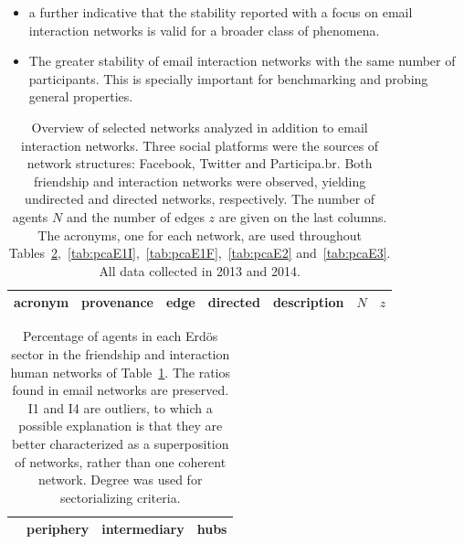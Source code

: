 \documentclass[%
 aip,
 jmp,%
 amsmath,amssymb,
 reprint,%
 floatfix,
]{revtex4-1}
\begin{document}
\begin{itemize}
	\item a further indicative that the stability reported with a focus on email interaction networks is valid for a broader class of phenomena.
	\item The greater stability of email interaction networks with the same number of participants. This is specially important for benchmarking and probing general properties.
\end{itemize}

\begin{table}[!h]
	\caption{Overview of selected networks analyzed in addition to email interaction networks. Three social platforms were the sources of network structures: Facebook, Twitter and Participa.br. Both friendship and interaction networks were observed, yielding undirected and directed networks, respectively. The number of agents $N$ and the number of edges $z$ are given on the last columns. The acronyms, one for each network, are used throughout Tables~\ref{tab:secE},~\ref{tab:pcaE1I},~\ref{tab:pcaE1F},~\ref{tab:pcaE2} and~\ref{tab:pcaE3}. All data collected in 2013 and 2014.}
\begin{center}
\begin{tabular}{| l | c | c | c | c | c | c | }\hline
	acronym & provenance & edge & directed & description & $N$ & $z$ \\ \hline\hline
	
\hline
\end{tabular}
\end{center}
\label{tab:E}
\end{table}


\begin{table}[!h]
	\caption{Percentage of agents in each Erd\"os sector in the friendship and interaction human networks of Table~\ref{tab:E}. The ratios found in email networks are preserved. I1 and I4 are outliers, to which a possible explanation is that they are better characterized as a superposition of networks, rather than one coherent network. Degree was used for sectorializing criteria.}
\begin{center}
\begin{tabular}{| l | c | c | c |}\hline
	 & periphery & intermediary & hubs \\ \hline\hline
	
\hline
\end{tabular}
\end{center}
\label{tab:secE}
\end{table}
\end{document}
